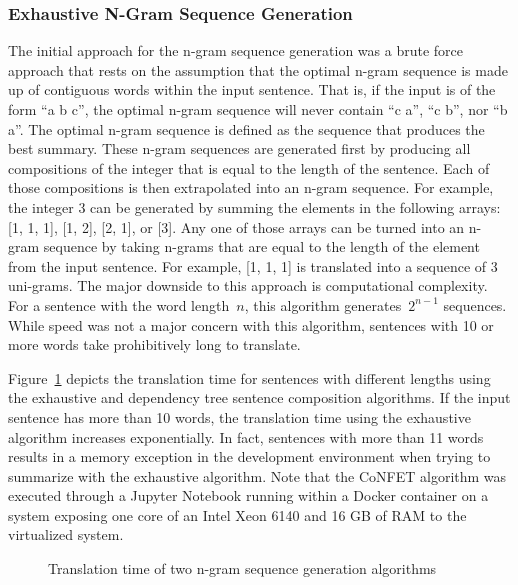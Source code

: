 \documentclass{article}[10]
\begin{document}
\subsubsection{Exhaustive N-Gram Sequence Generation\label{sec:exhaustive}}

The initial approach for the n-gram sequence generation was a brute force approach that rests on the assumption that the optimal n-gram sequence is made up of contiguous words within the input sentence. That is, if the input is of the form ``a b c'', the optimal n-gram sequence will never contain ``c a'', ``c b'', nor ``b a''. The optimal n-gram sequence is defined as the sequence that produces the best summary. These n-gram sequences are generated first by producing all compositions of the integer that is equal to the length of the sentence. Each of those compositions is then extrapolated into an n-gram sequence. For example, the integer 3 can be generated by summing the elements in the following arrays: [1, 1, 1], [1, 2], [2, 1], or [3]. Any one of those arrays can be turned into an n-gram sequence by taking n-grams that are equal to the length of the element from the input sentence. For example, [1, 1, 1] is translated into a sequence of 3 uni-grams. The major downside to this approach is computational complexity. For a sentence with the word length~\(n\), this algorithm generates~\(2^{n-1}\) sequences. While speed was not a major concern with this algorithm, sentences with 10 or more words take prohibitively long to translate.

Figure~\ref{fig:timing} depicts the translation time for sentences with different lengths using the exhaustive and dependency tree sentence composition algorithms. If the input sentence has more than 10 words, the translation time using the exhaustive algorithm increases exponentially. In fact, sentences with more than 11 words results in a memory exception in the development environment when trying to summarize with the exhaustive algorithm. Note that the CoNFET algorithm was executed through a Jupyter Notebook running within a Docker container on a system exposing one core of an Intel Xeon 6140 and 16 GB of RAM to the virtualized system.

\begin{figure}[h]
  \begin{center}
    \scalebox{0.6}{}
    \caption{Translation time of two n-gram sequence generation
      algorithms\label{fig:timing}}
  \end{center}
\end{figure}
\end{document}
